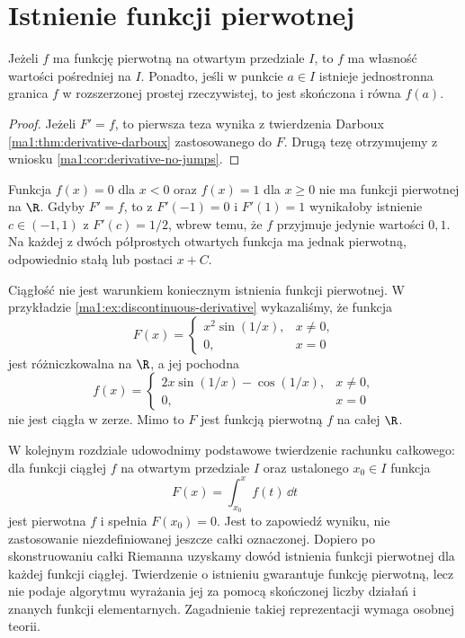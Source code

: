 \section{Istnienie funkcji pierwotnej}
\begin{stwierdzenie}
\label{ma1:prop:primitive-necessary}
Jeżeli $f$ ma funkcję pierwotną na otwartym przedziale $I$, to $f$ ma własność wartości pośredniej na $I$. Ponadto, jeśli w punkcie $a\in I$ istnieje jednostronna granica $f$ w rozszerzonej prostej rzeczywistej, to jest skończona i równa $f(a)$.
\end{stwierdzenie}
\begin{proof}
Jeżeli $F'=f$, to pierwsza teza wynika z twierdzenia Darboux \ref{ma1:thm:derivative-darboux} zastosowanego do $F$. Drugą tezę otrzymujemy z wniosku \ref{ma1:cor:derivative-no-jumps}.
\end{proof}
\begin{przyklad}
\label{ma1:ex:primitive-nonexistence}
Funkcja $f(x)=0$ dla $x<0$ oraz $f(x)=1$ dla $x\ge0$ nie ma funkcji pierwotnej na $\R$. Gdyby $F'=f$, to z $F'(-1)=0$ i $F'(1)=1$ wynikałoby istnienie $c\in(-1,1)$ z $F'(c)=1/2$, wbrew temu, że $f$ przyjmuje jedynie wartości $0,1$. Na każdej z dwóch półprostych otwartych funkcja ma jednak pierwotną, odpowiednio stałą lub postaci $x+C$.
\end{przyklad}

\begin{przyklad}
\label{ma1:ex:primitive-discontinuous}
Ciągłość nie jest warunkiem koniecznym istnienia funkcji pierwotnej. W przykładzie \ref{ma1:ex:discontinuous-derivative} wykazaliśmy, że funkcja
\[
 F(x)=
 \begin{cases}x^2\sin(1/x),&x\ne0,\\0,&x=0\end{cases}
\]
jest różniczkowalna na $\R$, a jej pochodna
\[
 f(x)=
 \begin{cases}2x\sin(1/x)-\cos(1/x),&x\ne0,\\0,&x=0\end{cases}
\]
nie jest ciągła w zerze. Mimo to $F$ jest funkcją pierwotną $f$ na całej $\R$.
\end{przyklad}

W kolejnym rozdziale udowodnimy podstawowe twierdzenie rachunku całkowego: dla funkcji ciągłej $f$ na otwartym przedziale $I$ oraz ustalonego $x_0\in I$ funkcja
\[
 F(x)=\int_{x_0}^{x} f(t)\,\dd t
\]
jest pierwotna $f$ i spełnia $F(x_0)=0$. Jest to zapowiedź wyniku, nie zastosowanie niezdefiniowanej jeszcze całki oznaczonej. Dopiero po skonstruowaniu całki Riemanna uzyskamy dowód istnienia funkcji pierwotnej dla każdej funkcji ciągłej. Twierdzenie o istnieniu gwarantuje funkcję pierwotną, lecz nie podaje algorytmu wyrażania jej za pomocą skończonej liczby działań i znanych funkcji elementarnych. Zagadnienie takiej reprezentacji wymaga osobnej teorii.
